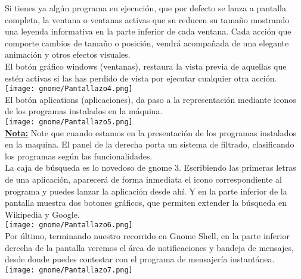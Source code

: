 \begin{itemize}
\begin{itemize}
\end{itemize}
Si tienes ya algún programa en ejecución, que por defecto se lanza a pantalla completa, la ventana o ventanas activas que su reducen su tamaño mostrando una leyenda informativa en la parte inferior de cada ventana. Cada acción que comporte cambios de tamaño o posición, vendrá acompañada de una elegante animación y otros efectos visuales.\\
El botón gráfico windows (ventanas), restaura la vista previa de aquellas que estén activas si las has perdido de vista por ejecutar cualquier otra acción.\\
\texttt{[image: gnome/Pantallazo4.png]}\\ 

El botón aplications (aplicaciones), da paso a la representación mediante iconos de los programas instalados en la máquina.\\

\texttt{[image: gnome/Pantallazo5.png]} \\
\underline{\bf Nota:} Note que cuando estamos en la presentación de los programas instalados en la maquina. El panel de la derecha porta un sistema de filtrado, clasificando los programas según las funcionalidades.\\
\newpage
La caja de búsqueda es lo novedoso de gnome 3. Escribiendo las primeras letras de una aplicación, aparecerá de forma inmediata el icono correspondiente al programa y puedes lanzar la aplicación desde ahí. Y en la parte inferior de la pantalla muestra dos botones gráficos, que permiten extender la búsqueda en Wikipedia y Google.\\ 

\texttt{[image: gnome/Pantallazo6.png]}\\ 
\newpage
Por último, terminando nuestro recorrido en Gnome Shell, en la parte inferior derecha de la pantalla veremos el área de notificaciones y bandeja de mensajes, desde donde puedes contestar con el programa de mensajería instantánea.\\
\texttt{[image: gnome/Pantallazo7.png]} 
\end{itemize}